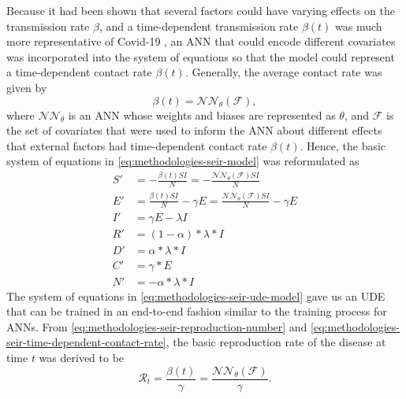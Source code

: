 Because it had been shown that several factors could have varying effects on the transmission rate $\beta$, and a time-dependent transmission rate $\beta(t)$ was much more representative of Covid-19 \cite{arikInterpretableSequenceLearning, changMobilityNetworkModels2021, dandekarMachineLearningAidedGlobal2020a, ihmecovid-19forecastingteamModelingCOVID19Scenarios2021, liSubstantialUndocumentedInfection2020}, an \gls{ANN} that could encode different covariates was incorporated into the system of equations so that the model could represent a time-dependent contact rate $\beta(t)$.
Generally, the average contact rate was given by
\begin{equation}
    \beta(t) = \mathcal{NN}_\theta (\mathcal{F}),
    \label{eq:methodologies-seir-time-dependent-contact-rate}
\end{equation}
where $\mathcal{NN}_\theta$ is an \gls{ANN} whose weights and biases are represented as $\theta$, and $\mathcal{F}$ is the set of covariates that were used to inform the \gls{ANN} about different effects that external factors had time-dependent contact rate $\beta(t)$.
Hence, the basic system of equations in \autoref{eq:methodologies-seir-model} was reformulated as
\begin{equation}
    \begin{aligned}
        S' &= - \frac{\beta(t) SI}{N} = -\frac{\mathcal{NN}_\theta(\mathcal{F}) SI}{N} \\
        E' &= \frac{\beta(t) SI}{N} - \gamma E = \frac{\mathcal{NN}_\theta(\mathcal{F}) SI}{N} - \gamma E \\
        I' &= \gamma E - \lambda I \\
        R' &= (1 - \alpha) * \lambda * I \\
        D' &= \alpha * \lambda * I \\
        C' &= \gamma * E \\
        N' &= - \alpha * \lambda * I
    \end{aligned}
    \label{eq:methodologies-seir-ude-model}
\end{equation}
The system of equations in \autoref{eq:methodologies-seir-ude-model} gave us an \gls{UDE} \cite{rackauckasUniversalDifferentialEquations2020} that can be trained in an end-to-end fashion similar to the training process for \glspl{ANN}.
From \autoref{eq:methodologies-seir-reproduction-number} and \autoref{eq:methodologies-seir-time-dependent-contact-rate}, the basic reproduction rate of the disease at time $t$ was derived to be
\begin{equation*}
    \mathcal{R}_t = \frac{\beta(t)}{\gamma} = \frac{\mathcal{NN}_\theta(\mathcal{F})}{\gamma}.
\end{equation*}

